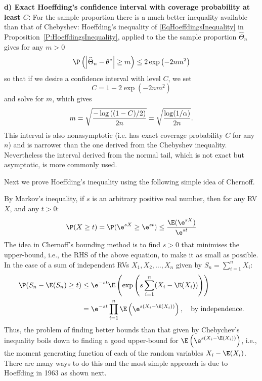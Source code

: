 \textbf{d) Exact Hoeffding's confidence interval with coverage probability at least $C$: } 
For the sample proportion there is a much better inequality available than that of Chebyshev: Hoeffding's inequality of \eqref{EqHoeffdingsInequality} in Proposition~\ref{P:HoeffdingsInequality}, 
applied to the the sample proportion $\widehat{\Theta}_{n}$ gives for any $%
m>0 $ 
\begin{equation}\label{EqExactHoeffdingsConfInterForProportion}
\P \left( \left\vert \widehat{\Theta}_{n}-\theta^*\right\vert \geq m\right) \leq 2\exp
\left( -2nm^{2}\right)
\end{equation}%
so that if we desire a confidence interval with level $C$, we set 
\begin{equation*}
C=1-2\exp \left( -2nm^{2}\right)
\end{equation*}
and solve for $m$, which gives 
\begin{equation*}
m=\sqrt{\frac{-\log \left( (1-C)/2 \right)}{2n}}=\sqrt{\frac{\log (1/\alpha )}{%
2n}}.
\end{equation*}%
This interval is also nonasymptotic (i.e. has exact coverage probability $C$
for any $n$) and is narrower than the one derived from the Chebyshev
inequality. Nevertheless the interval derived from the normal tail, which is
not exact but asymptotic, is more commonly used.

Next we prove Hoeffding's inequality using the following simple idea of Chernoff.

\begin{idea}
By Markov's inequality, if $s$ is an arbitrary positive real number, then for any RV $X$, and any $t>0$:
\[
\P(X \geq t) = \P (\e^{sX} \geq \e^{st}) \leq \frac{\E(\e^{sX})}{\e^{st}}
\]
The idea in Chernoff's bounding method is to find $s>0$ that minimises the upper-bound, i.e., the RHS of the above equation, to make it as small as possible. In the case of a sum of independent RVs $X_1,X_2,\ldots,X_n$ given by $S_n = \sum_{i=1}^n X_i$:
\begin{align}
\P(S_n - \E(S_n) \geq t) 
&\leq \e^{-st} \E \left( \exp \left( s \sum_{i=1}^n (X_i - \E(X_i)) \right)\right) \notag \\
&= \e^{-st} \prod_{i=1}^n \E\left( \e^{s(X_i-\E(X_i))}\right), \quad \text{by independence.} \label{EqChernoffsBoundingMethod}
\end{align}
Thus, the problem of finding better bounds than that given by Chebychev's inequality boils down to finding a good upper-bound for $\E\left( \e^{s(X_i-\E(X_i))}\right)$, i.e., 
the moment generating function of each of the random variables $X_i-\E(X_i)$. There are many ways to do this and the most simple approach is due to Hoeffding in 1963 as shown next.
\end{idea}


